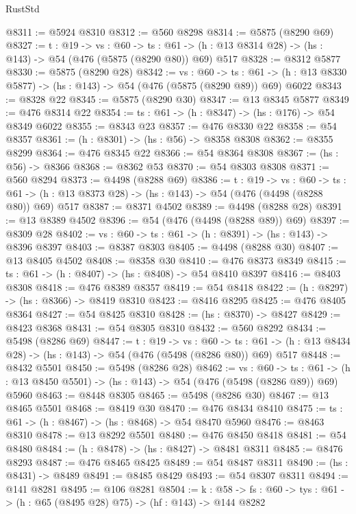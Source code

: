 \begin{lexlean}{RustStd}
\begin{coremodule}
@8311 := @5924 @8310
@8312 := @560 @8298
@8314 := @5875 (@8290 @69)
@8327 := {t : @19} ->
  {vs : @60} ->
  {ts : @61} -> (h : @13 @8314 @28) -> (hs : @143) -> @54 (@476 (@5875 (@8290 @80)) @69) @517
@8328 := @8312 @5877
@8330 := @5875 (@8290 @28)
@8342 := {vs : @60} ->
  {ts : @61} -> (h : @13 @8330 @5877) -> (hs : @143) -> @54 (@476 (@5875 (@8290 @89)) @69) @6022
@8343 := @8328 @22
@8345 := @5875 (@8290 @30)
@8347 := @13 @8345 @5877
@8349 := @476 @8314 @22
@8354 := {ts : @61} -> (h : @8347) -> (hs : @176) -> @54 @8349 @6022
@8355 := @8343 @23
@8357 := @476 @8330 @22
@8358 := @54 @8357
@8361 := (h : @8301) -> (hs : @56) -> @8358 @8308
@8362 := @8355 @8299
@8364 := @476 @8345 @22
@8366 := @54 @8364 @8308
@8367 := (hs : @56) -> @8366
@8368 := @8362 @53
@8370 := @54 @8303 @8308
@8371 := @560 @8294
@8373 := @4498 (@8288 @69)
@8386 := {t : @19} ->
  {vs : @60} ->
  {ts : @61} -> (h : @13 @8373 @28) -> (hs : @143) -> @54 (@476 (@4498 (@8288 @80)) @69) @517
@8387 := @8371 @4502
@8389 := @4498 (@8288 @28)
@8391 := @13 @8389 @4502
@8396 := @54 (@476 (@4498 (@8288 @89)) @69)
@8397 := @8309 @28
@8402 := {vs : @60} -> {ts : @61} -> (h : @8391) -> (hs : @143) -> @8396 @8397
@8403 := @8387 @8303
@8405 := @4498 (@8288 @30)
@8407 := @13 @8405 @4502
@8408 := @8358 @30
@8410 := @476 @8373 @8349
@8415 := {ts : @61} -> (h : @8407) -> (hs : @8408) -> @54 @8410 @8397
@8416 := @8403 @8308
@8418 := @476 @8389 @8357
@8419 := @54 @8418
@8422 := (h : @8297) -> (hs : @8366) -> @8419 @8310
@8423 := @8416 @8295
@8425 := @476 @8405 @8364
@8427 := @54 @8425 @8310
@8428 := (hs : @8370) -> @8427
@8429 := @8423 @8368
@8431 := @54 @8305 @8310
@8432 := @560 @8292
@8434 := @5498 (@8286 @69)
@8447 := {t : @19} ->
  {vs : @60} ->
  {ts : @61} -> (h : @13 @8434 @28) -> (hs : @143) -> @54 (@476 (@5498 (@8286 @80)) @69) @517
@8448 := @8432 @5501
@8450 := @5498 (@8286 @28)
@8462 := {vs : @60} ->
  {ts : @61} -> (h : @13 @8450 @5501) -> (hs : @143) -> @54 (@476 (@5498 (@8286 @89)) @69) @5960
@8463 := @8448 @8305
@8465 := @5498 (@8286 @30)
@8467 := @13 @8465 @5501
@8468 := @8419 @30
@8470 := @476 @8434 @8410
@8475 := {ts : @61} -> (h : @8467) -> (hs : @8468) -> @54 @8470 @5960
@8476 := @8463 @8310
@8478 := @13 @8292 @5501
@8480 := @476 @8450 @8418
@8481 := @54 @8480
@8484 := (h : @8478) -> (hs : @8427) -> @8481 @8311
@8485 := @8476 @8293
@8487 := @476 @8465 @8425
@8489 := @54 @8487 @8311
@8490 := (hs : @8431) -> @8489
@8491 := @8485 @8429
@8493 := @54 @8307 @8311
@8494 := @141 @8281
@8495 := @106 @8281
@8504 := {k : @58} ->
  {fs : @60} -> {tys : @61} -> (h : @65 (@8495 @28) @75) -> (hf : @143) -> @144 @8282

\end{coremodule}
\end{lexlean}
